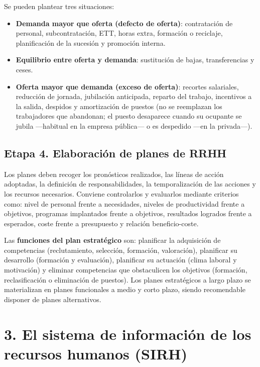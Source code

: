 \documentclass[12pt]{book} %
\providecommand{\tightlist}{%
  \setlength{\itemsep}{0pt}\setlength{\parskip}{0pt}}
\begin{document}
Se pueden plantear tres situaciones:

\begin{itemize}
\tightlist
\item
  \textbf{Demanda mayor que oferta (defecto de oferta)}: contratación de
  personal, subcontratación, ETT, horas extra, formación o reciclaje,
  planificación de la sucesión y promoción interna.
\item
  \textbf{Equilibrio entre oferta y demanda}: sustitución de bajas,
  transferencias y ceses.
\item
  \textbf{Oferta mayor que demanda (exceso de oferta)}: recortes
  salariales, reducción de jornada, jubilación anticipada, reparto del
  trabajo, incentivos a la salida, despidos y amortización de puestos
  (no se reemplazan los trabajadores que abandonan; el puesto desaparece
  cuando su ocupante se jubila ---habitual en la empresa pública--- o es
  despedido ---en la privada---).
\end{itemize}

\hypertarget{etapa-4.-elaboraciuxf3n-de-planes-de-rrhh}{%
\subsection{Etapa 4. Elaboración de planes de
RRHH}\label{etapa-4.-elaboraciuxf3n-de-planes-de-rrhh}}

Los planes deben recoger los pronósticos realizados, las líneas de
acción adoptadas, la definición de responsabilidades, la temporalización
de las acciones y los recursos necesarios. Conviene controlarlos y
evaluarlos mediante criterios como: nivel de personal frente a
necesidades, niveles de productividad frente a objetivos, programas
implantados frente a objetivos, resultados logrados frente a esperados,
coste frente a presupuesto y relación beneficio-coste.

Las \textbf{funciones del plan estratégico} son: planificar la
adquisición de competencias (reclutamiento, selección, formación,
valoración), planificar su desarrollo (formación y evaluación),
planificar su actuación (clima laboral y motivación) y eliminar
competencias que obstaculicen los objetivos (formación, reclasificación
o eliminación de puestos). Los planes estratégicos a largo plazo se
materializan en planes funcionales a medio y corto plazo, siendo
recomendable disponer de planes alternativos.

\hypertarget{el-sistema-de-informaciuxf3n-de-los-recursos-humanos-sirh}{%
\section{3. El sistema de información de los recursos humanos
(SIRH)}\label{el-sistema-de-informaciuxf3n-de-los-recursos-humanos-sirh}}
\end{document}
